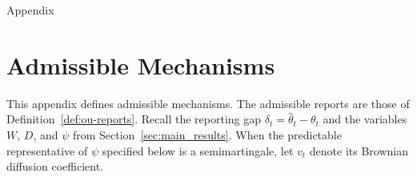 \documentclass[12pt]{article}
\newcommand{\hth}{\hat\theta}
\begin{document}

\newpage

\appendix
\Large{\textsf{Appendix}}
\normalsize

\section{Admissible Mechanisms}
\label{app:admissibility}

This appendix defines admissible mechanisms. The admissible reports
are those of Definition~\ref{def:ou-reports}. Recall the reporting gap \(\delta_t=\hth_t-\theta_t\) and the
variables \(W\), \(D\), and \(\psi\) from
Section~\ref{sec:main_results}. 
When the predictable representative of
\(\psi\) specified below is a semimartingale, let \(v_t\) denote its
Brownian diffusion coefficient.
\end{document}
